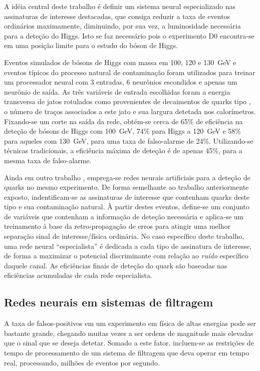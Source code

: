 A idéia central deste trabalho é definir um sistema neural especializado nas
assinaturas de interesse destacadas, que consiga reduzir a taxa de eventos
ordinários maximamente, diminuindo, por sua vez, a luminosidade necessária
para a deteção do Higgs. Isto se faz necessário pois o experimento D0
encontra-se em uma posição limite para o estudo do bóson de Higgs. 

Eventos simulados de bósons de Higgs com massa em 100, 120 e 130~GeV e eventos
típicos do processo natural de contaminação foram utilizados para treinar um
processador neural com 3 entradas, 6 neurônios escondidos e apenas um neurônio
de saída. As três variáveis de entrada escolhidas foram a energia transversa
de jatos rotulados como provenientes de decaimentos de quarks tipo
, o número de traços associados a este jato e sua largura detetada
nos calorímetros. Fixando-se um corte na saída da rede, obtém-se cerca de 65\%
de eficiência na deteção de bósons de Higgs com 100~GeV, 74\% para Higgs a
120~GeV e 58\% para aqueles com 130~GeV, para uma taxa de falso-alarme de
24\%. Utilizando-se técnicas tradicionais, a eficiência máxima de deteção é de
apenas 45\%, para a mesma taxa de falso-alarme.

Ainda em outro trabalho \cite{dudko-acat-2001}, emprega-se redes neurais
artificiais para a deteção de  quarks no mesmo experimento. De forma
semelhante ao trabalho anteriormente exposto, indentificam-se as assinaturas
de interesse que contenham quarks deste tipo e sua contaminação natural. À
partir destes eventos, define-se um conjunto de variáveis que contenham a
informação de deteção necessária e aplica-se um treinamento à base da
retro-propagação de erros para atingir uma melhor separação sinal de
interesse/física ordinária. No caso específico deste trabalho, uma rede neural
``especialista'' é dedicada a cada tipo de assinatura de interesse, de forma a
maximizar o potencial discriminante com relação ao \textit{ruído} específico
daquele canal. As eficiências finais de deteção do  quark são
baseadas nas eficiências acumuladas de cada rede especialista.

\subsection{Redes neurais em sistemas de filtragem}

A taxa de falsos-positivos em um experimento em física de altas energias pode
ser bastante grande, chegando muitas vezes a ser ordens de magnitude mais
elevadas que o sinal que se deseja detetar. Somado a este fator, incluem-se as
restrições de tempo de processamento de um sistema de filtragem que deva
operar em tempo real, processando, milhões de eventos por segundo.

